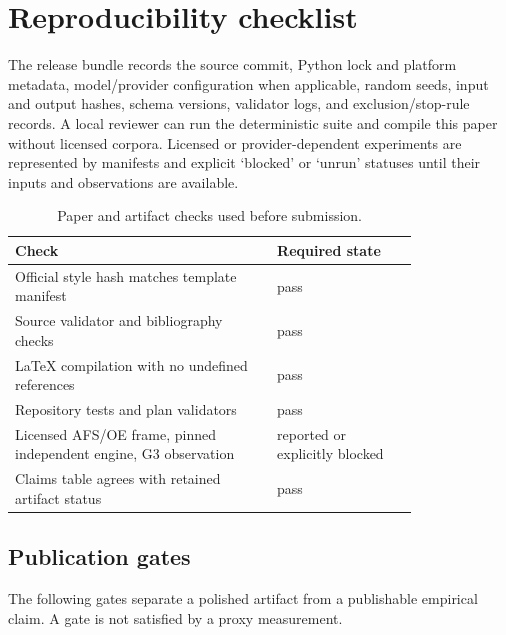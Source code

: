 \section{Reproducibility checklist}

The release bundle records the source commit, Python lock and platform
metadata, model/provider configuration when applicable, random seeds, input and
output hashes, schema versions, validator logs, and exclusion/stop-rule
records. A local reviewer can run the deterministic suite and compile this
paper without licensed corpora. Licensed or provider-dependent experiments are
represented by manifests and explicit `blocked' or `unrun' statuses until
their inputs and observations are available.

\begin{table}[h]
\centering
\caption{Paper and artifact checks used before submission.}
\label{tab:repro-checklist}
\begin{tabular}{p{0.52\linewidth}p{0.28\linewidth}}
\toprule
Check & Required state \\
\midrule
Official style hash matches template manifest & pass \\
Source validator and bibliography checks & pass \\
LaTeX compilation with no undefined references & pass \\
Repository tests and plan validators & pass \\
Licensed AFS/OE frame, pinned independent engine, G3 observation & reported or explicitly blocked \\
Claims table agrees with retained artifact status & pass \\
\bottomrule
\end{tabular}
\end{table}

\subsection{Publication gates}

The following gates separate a polished artifact from a publishable empirical
claim.  A gate is not satisfied by a proxy measurement.

